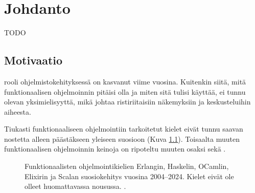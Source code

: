 
\chapter{Johdanto}

TODO

\section{Motivaatio}

 rooli ohjelmistokehityksessä on kasvanut viime vuosina. Kuitenkin siitä, mitä funktionaalisen ohjelmoinnin pitäisi olla ja miten sitä tulisi käyttää, ei tunnu olevan yksimielisyyttä, mikä johtaa ristiriitaisiin näkemyksiin ja keskusteluihin aiheesta.

Tiukasti funktionaaliseen ohjelmointiin tarkoitetut kielet eivät tunnu saavan nostetta alleen päästäkseen yleiseen suosioon (Kuva \ref{fig:fplangpopularity}).  Toisaalta muuten funktionaalisen ohjelmoinnin keinoja on ripoteltu muuten osaksi  sekä .

\begin{figure}[htbp]
    \datatable
    \pgfplotstablegetrowsof{\datatable}
    \centering
    \caption{Funktionaalisten ohjelmointikielien Erlangin, Haskelin, OCamlin, Elixirin ja Scalan suosiokehitys vuosina 2004–2024. Kielet eivät ole olleet huomattavassa nousussa. \cite{fplanggoogletrend}.}
    \label{fig:fplangpopularity}
\end{figure}

